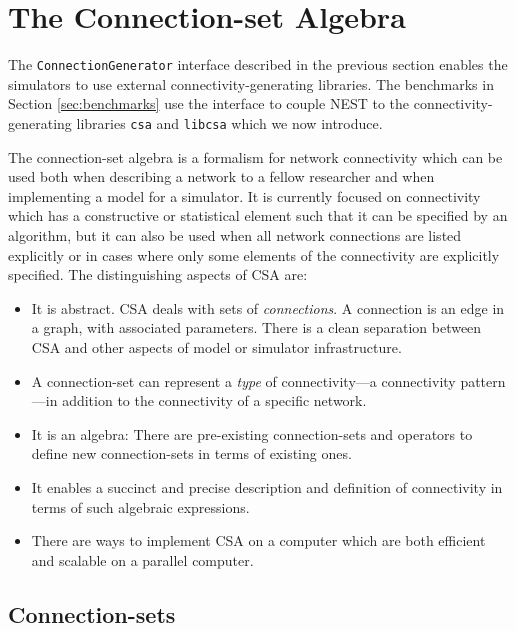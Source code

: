 \documentclass{frontiersSCNS} %
\begin{document}
\section{The Connection-set Algebra}\label{sec:csa}

The \verb|ConnectionGenerator| interface described in the previous
section enables the simulators to use external connectivity-generating
libraries. The benchmarks in Section \ref{sec:benchmarks} use the
interface to couple NEST to the connectivity-generating libraries
\verb|csa| and \verb|libcsa| which we now introduce.

The connection-set algebra is a formalism for network connectivity
which can be used both when describing a network to a fellow
researcher and when implementing a model for a simulator.  It is
currently focused on connectivity which has a constructive or
statistical element such that it can be specified by an algorithm, but
it can also be used when all network connections are listed explicitly or in cases
where only some elements of the connectivity are explicitly
specified. The distinguishing aspects of CSA are:
\begin{itemize}
\item It is abstract. CSA deals with sets of \emph{connections}. A
  connection is an edge in a graph, with associated
  parameters. There is a clean separation between CSA and other
  aspects of model or simulator infrastructure.
\item A connection-set can represent a \emph{type} of
  connectivity---a connectivity pattern---in addition to the connectivity
  of a specific network.
\item It is an algebra: There are pre-existing connection-sets and
  operators to define new connection-sets in terms of existing ones.
\item It enables a succinct and precise description and definition of
  connectivity in terms of such algebraic expressions.
\item There are ways to implement CSA on a computer which are both
  efficient and scalable on a parallel computer.
\end{itemize}


\subsection{Connection-sets}
\end{document}
